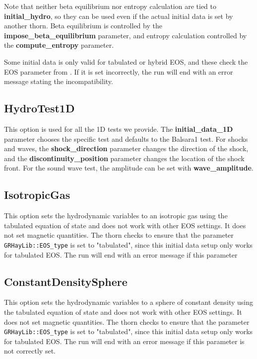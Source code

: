 \documentclass{article}
\begin{document}
Note that neither beta equilibrium nor entropy calculation are
tied to \textbf{initial\_hydro}, so they can be used even if
the actual initial data is set by another thorn. Beta equilibrium
is controlled by the \textbf{impose\_beta\_equilibrium} parameter,
and entropy calculation controlled by the \textbf{compute\_entropy}
parameter.

Some initial data is only valid for tabulated or hybrid EOS, and
these check the EOS parameter from \glib. If it is set incorrectly,
the run will end with an error message stating the incompatibility.

\subsection{HydroTest1D}

This option is used for all the 1D tests we provide. The
\textbf{initial\_data\_1D} parameter chooses the
specific test and defaults to the Balsara1 test. For shocks and
waves, the \textbf{shock\_direction} parameter changes the
direction of the shock, and the \textbf{discontinuity\_position}
parameter changes the location of the shock front. For the sound
wave test, the amplitude can be set with \textbf{wave\_amplitude}.

\subsection{IsotropicGas}

This option sets the hydrodynamic variables to an isotropic gas using
the tabulated equation of state and does not work with other EOS
settings. It does not set magnetic quantities. The thorn checks to
ensure that the \glib parameter \texttt{GRHayLib::EOS\_type} is set to
"tabulated", since this initial data setup only works for tabulated EOS.
The run will end with an error message if this parameter

\subsection{ConstantDensitySphere}

This option sets the hydrodynamic variables to a sphere of constant
density using the tabulated equation of state and does not work
with other EOS settings. It does not set magnetic quantities. The thorn
checks to ensure that the \glib parameter \texttt{GRHayLib::EOS\_type}
is set to "tabulated", since this initial data setup only works for
tabulated EOS. The run will end with an error message if this parameter
is not correctly set.
\end{document}

